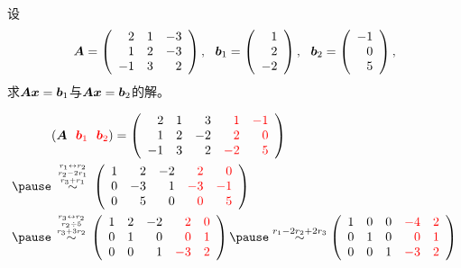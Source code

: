 \begin{frame}
  \begin{li}
    设
    $$
    \boldsymbol{A} = \left(
      \begin{array}{rrr}
        2&1&-3\\
        1&2&-3\\
        -1&3&2
      \end{array}
    \right),
    ~~
    {\boldsymbol{b}}_1=\left(
      \begin{array}{r}
        1\\
        2\\
        -2
      \end{array}
    \right),
    ~~
    {\boldsymbol{b}}_2=\left(
      \begin{array}{r}
        -1\\
        0\\
        5
      \end{array}
    \right),
    $$
    求$\boldsymbol{A}{\boldsymbol{x}}={\boldsymbol{b}}_1$与$\boldsymbol{A}{\boldsymbol{x}}={\boldsymbol{b}}_2$的解。
  \end{li}
\end{frame}


\begin{frame}
  \begin{jie}
    $$
    \begin{aligned}
      & (\MA~~\red{\vb_1}~~\red{\vb_2})
      = \left(
        \begin{array}{rrrrr}
          2 & 1 & 3 &\red{ 1} & \red{-1}\\
          1 & 2 &-2 &\red{ 2} & \red{ 0}\\
          -1 & 3 & 2 &\red{-2} & \red{ 5}        
        \end{array}\right) \\ \pause
      & \overset{{r_1\leftrightarrow r_2 \atop r_2-2r_1}\atop  r_3+r_1}{\sim}
      \left(
        \begin{array}{rrrrr}
          1 & 2 &-2 & \red{ 2} & \red{ 0}\\
          0 &-3 & 1 & \red{-3} & \red{-1}\\
          0 & 5 & 0 & \red{ 0} & \red{ 5}        
        \end{array}
      \right) \\ \pause
      & \overset{{r_3\leftrightarrow r_2 \atop r_2\div5}\atop  r_3+3r_2}{\sim}
      \left(
        \begin{array}{rrrrr}
          1 & 2 &-2 &\red{ 2} &  \red{0}\\
          0 & 1 & 0 &\red{ 0} &  \red{1}\\
          0 & 0 & 1 &\red{-3} &  \red{2}        
        \end{array}
      \right)  \pause \overset{r_1-2r_2+2r_3}{\sim}
      \left(
        \begin{array}{rrrrr}
          1 & 0 & 0 & \red{-4} & \red{2}\\
          0 & 1 & 0 & \red{0} &  \red{1}\\
          0 & 0 & 1 & \red{-3} &  \red{2}        
        \end{array}
      \right) 
    \end{aligned}
    $$
  \end{jie}

\end{frame}


